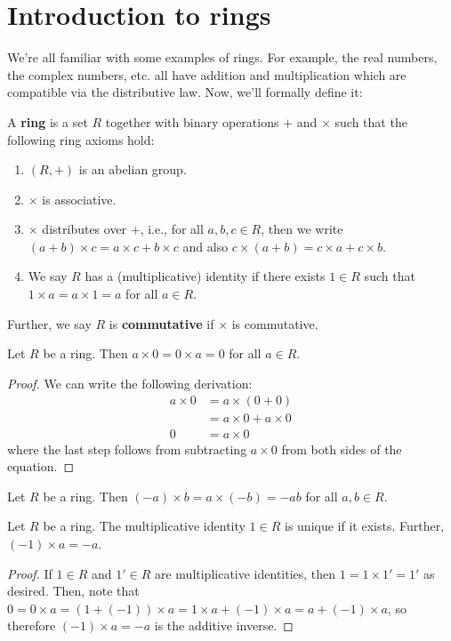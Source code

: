 \documentclass{article}
\theoremstyle{plain}
\begin{document}
\section{Introduction to rings}
We're all familiar with some examples of rings. For example, the real numbers, the complex numbers, etc. all have addition and multiplication which are compatible via the distributive law. Now, we'll formally define it:
\begin{definition}{}{}
A \textbf{ring} is a set $R$ together with binary operations $+$ and $\times$ such that the following ring axioms hold:
\begin{enumerate}[(1)]
\item $(R, +)$ is an abelian group.
\item $\times$ is associative.
\item $\times$ distributes over $+$, i.e., for all $a,b,c\in R$, then we write $(a+b)\times c = a\times c + b\times c$ and also $c\times(a+b) = c\times a + c\times b$.
\item We say $R$ has a (multiplicative) identity if there exists $1 \in R$ such that $1\times a = a\times 1 = a$ for all $a \in R$.
\end{enumerate}
Further, we say $R$ is \textbf{commutative} if $\times$ is commutative.
\end{definition}
\begin{theorem}{}{}
Let $R$ be a ring. Then $a \times 0 = 0\times a = 0$ for all $a \in R$.
\end{theorem}
\begin{proof}
We can write the following derivation:
	\begin{align*}
	a \times 0 &= a\times (0 + 0) \\
	&= a\times 0 + a\times 0 \\
	0 &= a\times 0
	\end{align*}
where the last step follows from subtracting $a\times 0$ from both sides of the equation.
\end{proof}
\begin{theorem}{}{}
Let $R$ be a ring. Then $(-a)\times b = a\times (-b) = -ab$ for all $a,b \in R$.
\end{theorem}
\begin{theorem}{}{}
Let $R$ be a ring. The multiplicative identity $1 \in R$ is unique if it exists. Further, $(-1)\times a = -a$.
\end{theorem}
\begin{proof}
If $1 \in R$ and $1' \in R$ are multiplicative identities, then $1 = 1\times 1' = 1'$ as desired. Then, note that $0 = 0\times a = (1 + (-1))\times a = 1\times a + (-1) \times a = a + (-1)\times a$, so therefore $(-1)\times a = -a$ is the additive inverse.
\end{proof}
\end{document}
